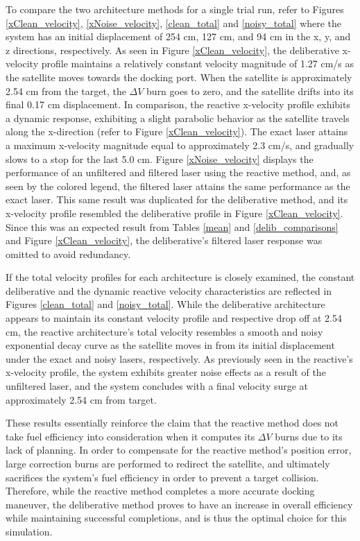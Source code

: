 \documentclass[journal, 10pt]{IEEEtran}
\begin{document}
To compare the two architecture methods for a single trial run, refer to Figures \ref{xClean_velocity}, \ref{xNoise_velocity}, \ref{clean_total} and \ref{noisy_total} where the system has an initial displacement of 254 cm, 127 cm, and 94 cm in the x, y, and z directions, respectively. As seen in Figure \ref{xClean_velocity}, the deliberative x-velocity profile maintains a relatively constant velocity magnitude of 1.27 cm/s as the satellite moves towards the docking port. When the satellite is approximately 2.54 cm from the target, the $\Delta V$ burn goes to zero, and the satellite drifts into its final 0.17 cm displacement. In comparison, the reactive x-velocity profile exhibits a dynamic response, exhibiting a slight parabolic behavior as the satellite travels along the x-direction (refer to Figure \ref{xClean_velocity}). The exact laser attains a maximum x-velocity magnitude equal to approximately 2.3 cm/s, and gradually slows to a stop for the last 5.0 cm. Figure \ref{xNoise_velocity} displays the performance of an unfiltered and filtered laser using the reactive method, and, as seen by the colored legend, the filtered laser attains the same performance as the exact laser. This same result was duplicated for the deliberative method, and its x-velocity profile resembled the deliberative profile in Figure \ref{xClean_velocity}. Since this was an expected result from Tables \ref{mean} and \ref{delib_comparisons} and Figure \ref{xClean_velocity}, the deliberative's filtered laser response was omitted to avoid redundancy. 

If the total velocity profiles for each architecture is closely examined, the constant deliberative and the dynamic reactive velocity characteristics are reflected in Figures \ref{clean_total} and \ref{noisy_total}. While the deliberative architecture appears to maintain its constant velocity profile and respective drop off at 2.54 cm, the reactive architecture's total velocity resembles a smooth and noisy exponential decay curve as the satellite moves in from its initial displacement under the exact and noisy lasers, respectively. As previously seen in the reactive's x-velocity profile, the system exhibits greater noise effects as a result of the unfiltered laser, and the system concludes with a final velocity surge at approximately 2.54 cm from target.

These results essentially reinforce the claim that the reactive method does not take fuel efficiency into consideration when it computes its $\Delta V$  burns due to its lack of planning. In order to compensate for the reactive method's position error, large correction burns are performed to redirect the satellite, and ultimately sacrifices the system's fuel efficiency in order to prevent a target collision. Therefore, while the reactive method completes a more accurate docking maneuver, the deliberative method proves to have an increase in overall efficiency while maintaining successful completions, and is thus the optimal choice for this simulation.
\end{document}

